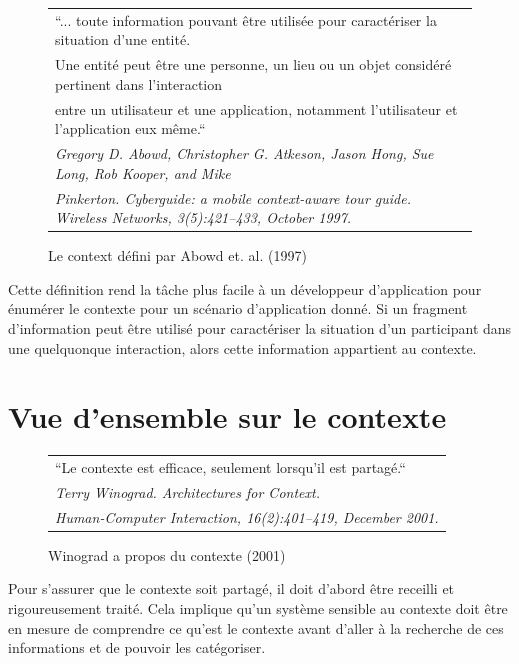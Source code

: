 \begin{figure}[h]
  \centering
  \begin{tabular}{l}
    ``... toute information pouvant être utilisée pour caractériser la
    situation d'une entité.\\
    Une entité peut être une personne, un lieu ou un
    objet considéré pertinent dans l'interaction \\
    entre un utilisateur et une
    application, notamment l'utilisateur et l'application eux même.``
    \cite{abowd_baltzer_1997} \\
    \em \footnotesize Gregory D. Abowd, Christopher G. Atkeson, Jason Hong, Sue
    Long, Rob Kooper, and Mike \\
    \em \footnotesize Pinkerton. Cyberguide: a mobile context-aware tour guide.
    Wireless Networks, 3(5):421–433, October 1997. 
  \end{tabular}
  \caption{Le context défini par Abowd et. al. (1997)}
  \label{fig:quote}
\end{figure}

Cette définition rend la tâche plus facile à un développeur d'application pour
énumérer le contexte pour un scénario d'application donné. Si un fragment
d'information peut être utilisé pour caractériser la situation d'un participant
dans une quelquonque interaction, alors cette information appartient au
contexte.

\section{Vue d'ensemble sur le contexte}

\begin{figure}[h]
  \centering
  \begin{tabular}{l}
    ``Le contexte est efficace, seulement lorsqu'il est partagé.``
    \cite{winograd_architectures_2001} \\
    \em \footnotesize Terry Winograd. Architectures for Context. \\
    \em \footnotesize Human-Computer Interaction, 16(2):401–419,
     December 2001. \\
  \end{tabular}
  \caption{Winograd a propos du contexte (2001)}
  \label{fig:quote}
\end{figure}

Pour s'assurer que le contexte soit partagé, il doit d'abord être receilli et
rigoureusement traité. Cela implique qu'un système sensible au contexte doit
être en mesure de comprendre ce qu'est le contexte avant d'aller à la recherche
de ces informations et de pouvoir les catégoriser.

